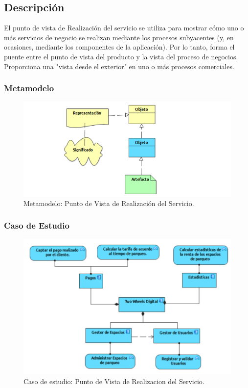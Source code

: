 \subsection{Descripción}
El punto de vista de Realización del servicio se utiliza para mostrar cómo uno o más servicios de negocio se realizan mediante los procesos subyacentes (y, en ocasiones, mediante los componentes de la aplicación). Por lo tanto, forma el puente entre el punto de vista del producto y la vista del proceso de negocios. Proporciona una "vista desde el exterior" en uno o más procesos comerciales.

\subsubsection{Metamodelo}
\begin{figure}[H]
	\centering
	\includegraphics[width=1.0\textwidth]{imagenes/Metamodelos/Tecnologia/Estructura_informacion.PDF}
	\caption{Metamodelo: Punto de Vista de Realización del Servicio.}
	\label{fig:gap_analysis}
\end{figure}

\subsubsection{Caso de Estudio}

\begin{figure}[H]
	\centering
	\includegraphics[width=1.0\textwidth]{imagenes/Caso_Estudio/Tecnologia/ComAplicacion.PDF}
	\caption{Caso de estudio: Punto de Vista de Realizacion del Servicio.}
	\label{fig:gap_analysis}
\end{figure}


